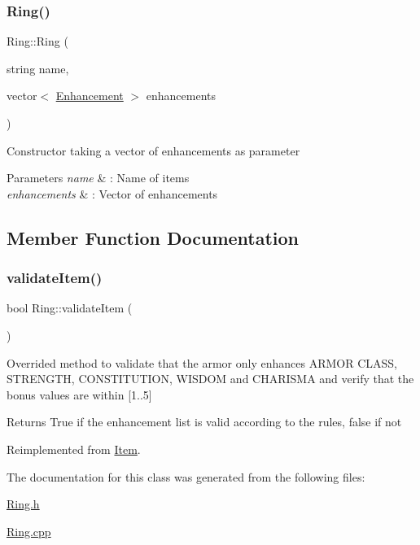 \subsubsection{\texorpdfstring{Ring()}{Ring()}\hspace{0.1cm}{\footnotesize\ttfamily [2/2]}}
{\footnotesize\ttfamily Ring\+::\+Ring (\begin{DoxyParamCaption}\item[{string}]{name,  }\item[{vector$<$ \hyperlink{class_enhancement}{Enhancement} $>$}]{enhancements }\end{DoxyParamCaption})}

Constructor taking a vector of enhancements as parameter 
\begin{DoxyParams}{Parameters}
{\em name} & \+: Name of items \\
\hline
{\em enhancements} & \+: Vector of enhancements \\
\hline
\end{DoxyParams}


\subsection{Member Function Documentation}
\hypertarget{class_ring_a9170e11e83f0a5b8443e9267e5bd6c8a}{}\label{class_ring_a9170e11e83f0a5b8443e9267e5bd6c8a} 
\subsubsection{\texorpdfstring{validate\+Item()}{validateItem()}}
{\footnotesize\ttfamily bool Ring\+::validate\+Item (\begin{DoxyParamCaption}{ }\end{DoxyParamCaption})\hspace{0.3cm}{\ttfamily [virtual]}}

Overrided method to validate that the armor only enhances \textquotesingle{}A\+R\+M\+OR C\+L\+A\+SS\textquotesingle{}, \textquotesingle{}S\+T\+R\+E\+N\+G\+TH\textquotesingle{}, \textquotesingle{}C\+O\+N\+S\+T\+I\+T\+U\+T\+I\+ON\textquotesingle{}, \textquotesingle{}W\+I\+S\+D\+OM\textquotesingle{} and \textquotesingle{}C\+H\+A\+R\+I\+S\+MA\textquotesingle{} and verify that the bonus values are within \mbox{[}1..5\mbox{]} \begin{DoxyReturn}{Returns}
True if the enhancement list is valid according to the rules, false if not 
\end{DoxyReturn}


Reimplemented from \hyperlink{class_item_a6603371b60aaded48f697975c81fc25b}{Item}.



The documentation for this class was generated from the following files\+:\begin{DoxyCompactItemize}
\item 
\hyperlink{_ring_8h}{Ring.\+h}\item 
\hyperlink{_ring_8cpp}{Ring.\+cpp}\end{DoxyCompactItemize}
